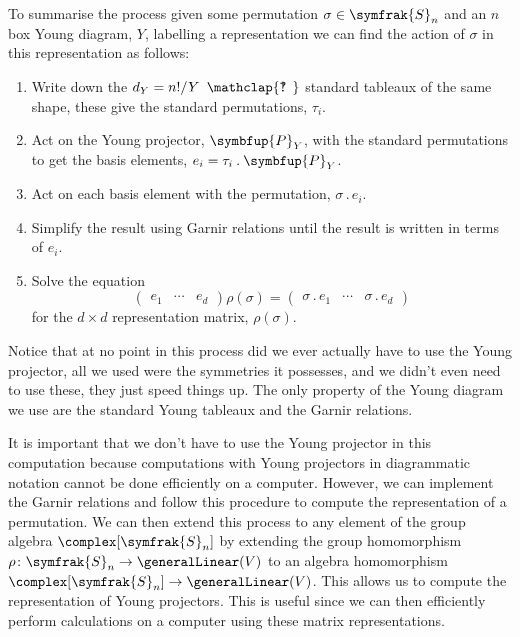 \documentclass[fleqn]{NotesClass}
\newcommand{\symmetricGroup}[1][n]{\symfrak{S}_{#1}}
\newcommand{\action}{\mathbin{.}}
\newcommand{\projector}[1]{\symbfup{P}_{#1}}
\newcommand{\hooknumber}[1]{#1{\phantom{?}\mkern1mu\mathclap{\ooalign{\hfil ? \hfil \cr \hfil ! \hfil}}}}
\renewcommand{\ve}[1]{e_{#1}}
\begin{document}
    To summarise the process given some permutation \(\sigma \in \symmetricGroup\) and an \(n\) box Young diagram, \(Y\), labelling a representation we can find the action of \(\sigma\) in this representation as follows:
    \begin{enumerate}
        \item Write down the \(d_Y = n!/\hooknumber{Y}\) standard tableaux of the same shape, these give the standard permutations, \(\tau_i\).
        \item Act on the Young projector, \(\projector{Y}\), with the standard permutations to get the basis elements, \(\ve{i} = \tau_i \action \projector{Y}\).
        \item Act on each basis element with the permutation, \(\sigma \action \ve{i}\).
        \item Simplify the result using Garnir relations until the result is written in terms of \(\ve{i}\).
        \item Solve the equation
        \begin{equation}
            \begin{pmatrix}
                \ve{1} & \cdots & \ve{d}
            \end{pmatrix}
            \rho(\sigma) = 
            \begin{pmatrix}
                \sigma \action \ve{1} & \cdots & \sigma \action \ve{d}
            \end{pmatrix}
        \end{equation}
        for the \(d \times d\) representation matrix, \(\rho(\sigma)\).
    \end{enumerate}
    
    Notice that at no point in this process did we ever actually have to use the Young projector, all we used were the symmetries it possesses, and we didn't even need to use these, they just speed things up.
    The only property of the Young diagram we use are the standard Young tableaux and the Garnir relations.
    
    It is important that we don't have to use the Young projector in this computation because computations with Young projectors in diagrammatic notation cannot be done efficiently on a computer.
    However, we can implement the Garnir relations and follow this procedure to compute the representation of a permutation.
    We can then extend this process to any element of the group algebra \(\complex[\symmetricGroup]\) by extending the group homomorphism \(\rho\colon \symmetricGroup \to \generalLinear(V)\) to an algebra homomorphism \(\complex[\symmetricGroup] \to \generalLinear(V)\).
    This allows us to compute the representation of Young projectors.
    This is useful since we can then efficiently perform calculations on a computer using these matrix representations.
    
\end{document}
